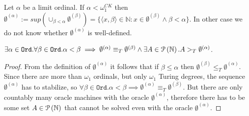 Let $\alpha$ be a limit ordinal. If $\alpha < \omega_1^{CK}$ then $\emptyset^{(\alpha)}:=sup(\cup_{\beta < \alpha} \emptyset^{(\beta)})=\{\langle x, \beta \rangle \in \mathbb{N} : x \in \emptyset^{(\beta)} \land \beta < \alpha\}$. In other case we do not know whether $\emptyset^{(\alpha)}$ is well-defined.

\begin{proposition}
$\exists \alpha \in \mathtt{Ord}. \forall \beta \in \mathtt{Ord}. \alpha < \beta \implies \emptyset^{(\alpha)} \equiv_T \emptyset^{(\beta)} \land \exists A \in \mathcal{P} \left({ \mathbb{N} }\right). A >_T \emptyset^{(\alpha)}$.
\end{proposition}

\begin{proof}
From the definition of $\emptyset^{(\alpha)}$ it follows that if $\beta \le \alpha$ then $\emptyset^{(\beta)} \le_T \emptyset^{(\alpha)}$. Since there are more than $\omega_1$ ordinals, but only $\omega_1$ Turing degrees, the sequence $\emptyset^{(\alpha)}$ has to stabilize, so $\forall \beta \in \mathtt{Ord}. \alpha < \beta \implies \emptyset^{(\alpha)} \equiv_T \emptyset^{(\beta)}$. But there are only countably many oracle machines with the oracle $\emptyset^{(\alpha)}$, therefore there has to be some set $A \in \mathcal{P} \left({ \mathbb{N} }\right)$ that cannot be solved even with the oracle $\emptyset^{(\alpha)}$.
\end{proof}